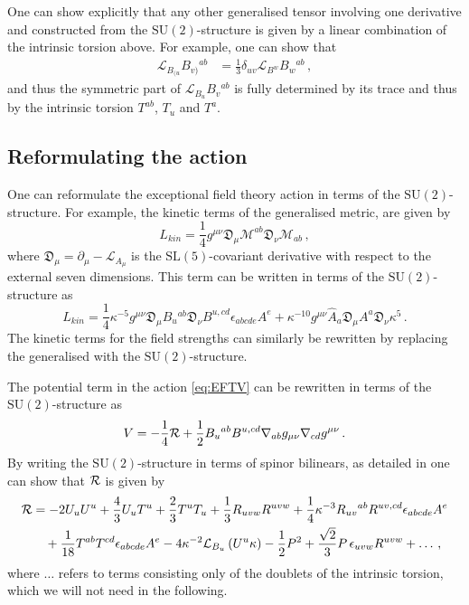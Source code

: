 \documentclass{PoS}
\newcommand{\SU}[1]{\mathrm{SU}( #1 )}
\newcommand{\SL}[1]{\mathrm{SL}( #1 )}
\newcommand{\D}{\mathfrak{D}}
\newcommand{\gL}{\mathcal{L}}
\newcommand{\hA}{\hat{A}}
\newcommand{\gM}{\mathcal{M}}
\begin{document}
One can show explicitly that any other generalised tensor involving one derivative and constructed from the $\SU{2}$-structure is given by a linear combination of the intrinsic torsion above. For example, one can show that
\begin{equation}
 \begin{split}
  \gL_{B_{(u}} B_{v)}{}^{ab} &= \frac13 \delta_{uv} \gL_{B^w} B_w{}^{ab} \,,
 \end{split}
\end{equation}
and thus the symmetric part of $\gL_{B_u} B_v{}^{ab}$ is fully determined by its trace and thus by the intrinsic torsion $T^{ab}$, $T_u$ and $T^a$.

\subsection{Reformulating the action}
One can reformulate the exceptional field theory action in terms of the $\SU{2}$-structure. For example, the kinetic terms of the generalised metric, are given by \cite{Hohm:2013vpa}
\begin{equation}
 L_{kin} = \frac14 g^{\mu\nu} \D_\mu \gM^{ab} \D_\nu \gM_{ab} \,, 
\end{equation}
where $\D_\mu = \partial_\mu - \gL_{A_\mu}$ is the $\SL{5}$-covariant derivative with respect to the external seven dimensions. This term can be written in terms of the $\SU{2}$-structure as
\begin{equation}
 L_{kin} = \frac14 \kappa^{-5} g^{\mu\nu} \D_\mu B_u{}^{ab} \D_\nu B^{u,cd} \epsilon_{abcde} A^e + \kappa^{-10} g^{\mu\nu} \hA_a \D_\mu A^a \D_\nu \kappa^5 \,. \label{eq:ScalarKinTerms}
\end{equation}
The kinetic terms for the field strengths can similarly be rewritten by replacing the generalised with the $\SU{2}$-structure.

The potential term in the action \eqref{eq:EFTV} can be rewritten in terms of the $\SU{2}$-structure as
\begin{equation}
 V = - \frac14 {\cal R} + \frac12 B_{u}{}^{ab} B^{u,cd} \nabla_{ab} g_{\mu\nu} \nabla_{cd} g^{\mu\nu} \,. \label{eq:Potential}
\end{equation}
By writing the $\SU{2}$-structure in terms of spinor bilinears, as detailed in \cite{Malek:2016bpu} one can show that ${\cal R}$ is given by
\begin{equation}
 \begin{split}
  \cal{R} &= -2 U_u U^u + \frac43 U_u T^u + \frac{2}{3} T^u T_u + \frac13 R_{uvw} R^{uvw} + \frac14 \kappa^{-3} R_{uv}{}^{ab} R^{uv,cd} \epsilon_{abcde} A^e \\
  & \quad + \frac{1}{18} T^{ab} T^{cd} \epsilon_{abcde} A^e - 4 \kappa^{-2} \gL_{B_u} \left( U^u \kappa \right) - \frac12 P^2 + \frac{\sqrt{2}}{3} P\, \epsilon_{uvw} R^{uvw} + \ldots \,, \label{eq:RicciScalar}
 \end{split}
\end{equation}
where $\ldots$ refers to terms consisting only of the doublets of the intrinsic torsion, which we will not need in the following.
\end{document}
